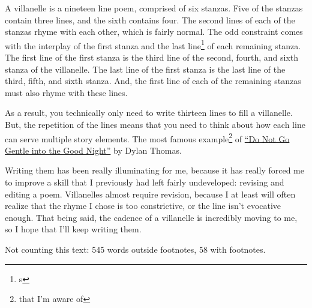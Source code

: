 \documentclass[12pt]{article}[titlepage]
\newcommand{\say}[1]{``#1''}
\newcommand{\1}{\={a}}
\newcommand{\2}{\={e}}
\newcommand{\3}{\={\i}}
\newcommand{\4}{\=o}
\newcommand{\5}{\=u}
\newcommand{\6}{\={A}}
\renewcommand{\,}{\textsuperscript{,}}
\begin{document}
A villanelle is a nineteen line poem, comprised of six stanzas.
Five of the stanzas contain three lines, and the sixth contains four.
The second lines of each of the stanzas rhyme with each other, which is fairly normal.
The odd constraint comes with the interplay of the first stanza and the last line\footnote{s} of each remaining stanza.
The first line of the first stanza is the third line of the second, fourth, and sixth stanza of the villanelle.
The last line of the first stanza is the last line of the third, fifth, and sixth stanza.
And, the first line of each of the remaining stanzas must also rhyme with these lines.

As a result, you technically only need to write thirteen lines to fill a villanelle.
But, the repetition of the lines means that you need to think about how each line can serve multiple story elements.
The most famous example\footnote{that I'm aware of} of \href{https://poets.org/poem/do-not-go-gentle-good-night}{\say{Do Not Go Gentle into the Good Night}} by Dylan Thomas.

Writing them has been really illuminating for me, because it has really forced me to improve a skill that I previously had left fairly undeveloped: revising and editing a poem.
Villanelles almost require revision, because I at least will often realize that the rhyme I chose is too constrictive, or the line isn't evocative enough.
That being said, the cadence of a villanelle is incredibly moving to me, so I hope that I'll keep writing them.

Not counting this text:
545 words outside footnotes, 58 with footnotes.
\end{document}
